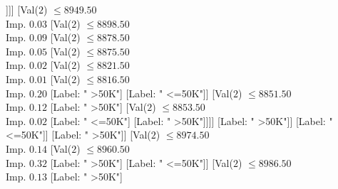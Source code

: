 \documentclass[margin=10pt]{standalone}
\begin{document}
\begin{forest}
																																								[Val($2$) $ \leq 8747.50$ \\ Imp. $0.02$
																																									[Label: " <=50K"]
																																									[Val($2$) $ \leq 8749.50$ \\ Imp. $0.14$
																																										[Label: " >50K"]
																																										[Val($2$) $ \leq 8779.50$ \\ Imp. $0.02$
																																											[Label: " >50K"]
																																											[Label: " <=50K"]]]]
																																								[Val($2$) $ \leq 8949.50$ \\ Imp. $0.03$
																																									[Val($2$) $ \leq 8898.50$ \\ Imp. $0.09$
																																										[Val($2$) $ \leq 8878.50$ \\ Imp. $0.05$
																																											[Val($2$) $ \leq 8875.50$ \\ Imp. $0.02$
																																												[Val($2$) $ \leq 8821.50$ \\ Imp. $0.01$
																																													[Val($2$) $ \leq 8816.50$ \\ Imp. $0.20$
																																														[Label: " >50K"]
																																														[Label: " <=50K"]]
																																													[Val($2$) $ \leq 8851.50$ \\ Imp. $0.12$
																																														[Label: " >50K"]
																																														[Val($2$) $ \leq 8853.50$ \\ Imp. $0.02$
																																															[Label: " <=50K"]
																																															[Label: " >50K"]]]]
																																												[Label: " >50K"]]
																																											[Label: " <=50K"]]
																																										[Label: " >50K"]]
																																									[Val($2$) $ \leq 8974.50$ \\ Imp. $0.14$
																																										[Val($2$) $ \leq 8960.50$ \\ Imp. $0.32$
																																											[Label: " >50K"]
																																											[Label: " <=50K"]]
																																										[Val($2$) $ \leq 8986.50$ \\ Imp. $0.13$
																																											[Label: " >50K"]

\end{forest}
\end{document}

